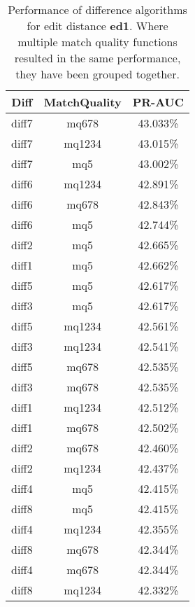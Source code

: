 \begin{table}[tbph]
\begin{center}
\begin{tabular}{|c|c||c|}
\hline
Diff & MatchQuality & PR-AUC  \\
\hline
\hline
diff7 & mq678 & 43.033\% \\
diff7 & mq1234 & 43.015\% \\
diff7 & mq5 & 43.002\% \\
diff6 & mq1234 & 42.891\% \\
diff6 & mq678 & 42.843\% \\
diff6 & mq5 & 42.744\% \\
diff2 & mq5 & 42.665\% \\
diff1 & mq5 & 42.662\% \\
diff5 & mq5 & 42.617\% \\
diff3 & mq5 & 42.617\% \\
diff5 & mq1234 & 42.561\% \\
diff3 & mq1234 & 42.541\% \\
diff5 & mq678 & 42.535\% \\
diff3 & mq678 & 42.535\% \\
diff1 & mq1234 & 42.512\% \\
diff1 & mq678 & 42.502\% \\
diff2 & mq678 & 42.460\% \\
diff2 & mq1234 & 42.437\% \\
diff4 & mq5 & 42.415\% \\
diff8 & mq5 & 42.415\% \\
diff4 & mq1234 & 42.355\% \\
diff8 & mq678 & 42.344\% \\
diff4 & mq678 & 42.344\% \\
diff8 & mq1234 & 42.332\% \\
\hline
\end{tabular}
\end{center}
\caption{Performance of difference algorithms for
  edit distance \textbf{ed1}.  Where multiple match
  quality functions resulted in the same performance, they
  have been grouped together.}
\label{tab:editlongbyed1}
\end{table}
